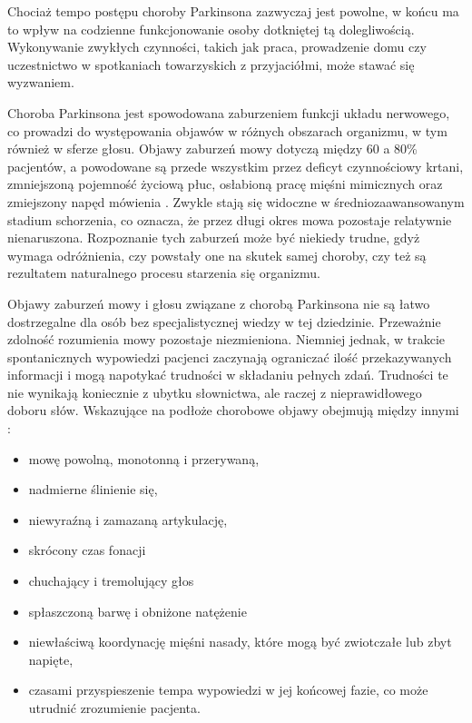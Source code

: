 Chociaż tempo postępu choroby Parkinsona zazwyczaj jest powolne, w końcu ma to wpływ na codzienne funkcjonowanie osoby dotkniętej tą dolegliwością.
Wykonywanie zwykłych czynności, takich jak praca, prowadzenie domu czy uczestnictwo w spotkaniach towarzyskich z przyjaciółmi, może stawać się wyzwaniem.

Choroba Parkinsona jest spowodowana zaburzeniem funkcji układu nerwowego, co prowadzi do występowania objawów w różnych obszarach organizmu, w tym również w sferze głosu.
Objawy zaburzeń mowy dotyczą między 60 a 80\% pacjentów, a powodowane są przede wszystkim przez deficyt czynnościowy krtani,
zmniejszoną pojemność życiową płuc, osłabioną pracę mięśni mimicznych oraz zmiejszony napęd mówienia \cite{lewicka}.
Zwykle stają się widoczne w średniozaawansowanym stadium schorzenia, co oznacza, że przez długi okres mowa pozostaje relatywnie nienaruszona.
Rozpoznanie tych zaburzeń może być niekiedy trudne, gdyż wymaga odróżnienia, czy powstały one na skutek samej choroby, czy też są rezultatem naturalnego
procesu starzenia się organizmu.

Objawy zaburzeń mowy i głosu związane z chorobą Parkinsona nie są łatwo dostrzegalne dla osób bez specjalistycznej wiedzy w tej dziedzinie.
Przeważnie zdolność rozumienia mowy pozostaje niezmieniona.
Niemniej jednak, w trakcie spontanicznych wypowiedzi pacjenci zaczynają ograniczać ilość przekazywanych informacji i mogą napotykać trudności w składaniu
pełnych zdań.
Trudności te nie wynikają koniecznie z ubytku słownictwa, ale raczej z nieprawidłowego doboru słów.
Wskazujące na podłoże chorobowe objawy obejmują między innymi \cite{Szurek_2018, Kuryłowicz_2019}:
\begin{itemize}[itemsep=0.1pt]
	\item mowę powolną, monotonną i przerywaną,
	\item nadmierne ślinienie się,
	\item niewyraźną i zamazaną artykulację,
	\item skrócony czas fonacji
	\item chuchający i tremolujący głos
	\item spłaszczoną barwę i obniżone natężenie
	\item niewłaściwą koordynację mięśni nasady, które mogą być zwiotczałe lub zbyt napięte,
	\item czasami przyspieszenie tempa wypowiedzi w jej końcowej fazie, co może utrudnić zrozumienie pacjenta.
\end{itemize}

